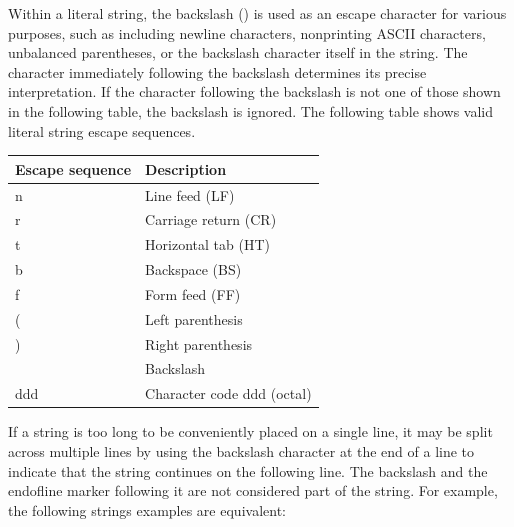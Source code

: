 \documentclass[letterpaper,12pt,english,openany,oneside]{sphinxmanual}
\begin{document}
Within a literal string, the backslash () is used as an escape character for various purposes, such as including newline characters, nonprinting ASCII characters, unbalanced parentheses, or the backslash character itself in the string. The character immediately following the backslash determines its precise interpretation. If the character following the backslash is not one of those shown in the following table, the backslash is ignored. The following table shows valid literal string escape sequences.


\begin{savenotes}\sphinxattablestart
\centering
\begin{tabulary}{\linewidth}[t]{|T|T|}
\hline
\sphinxstyletheadfamily 
Escape sequence
&\sphinxstyletheadfamily 
Description
\\
\hline
n
&
Line feed (LF)
\\
\hline
r
&
Carriage return (CR)
\\
\hline
t
&
Horizontal tab (HT)
\\
\hline
b
&
Backspace (BS)
\\
\hline
f
&
Form feed (FF)
\\
\hline
(
&
Left parenthesis
\\
\hline
)
&
Right parenthesis
\\
\hline

&
Backslash
\\
\hline
ddd
&
Character code ddd (octal)
\\
\hline
\end{tabulary}
\par
\sphinxattableend\end{savenotes}

If a string is too long to be conveniently placed on a single line, it may be split across multiple lines by using the backslash character at the end of a line to indicate that the string continues on the following line. The backslash and the end\sphinxhyphen{}of\sphinxhyphen{}line marker following it are not considered part of the string. For example, the following strings examples are equivalent:

\begin{sphinxVerbatim}[commandchars=\\\{\}]
     
     
\end{sphinxVerbatim}
\end{document}
